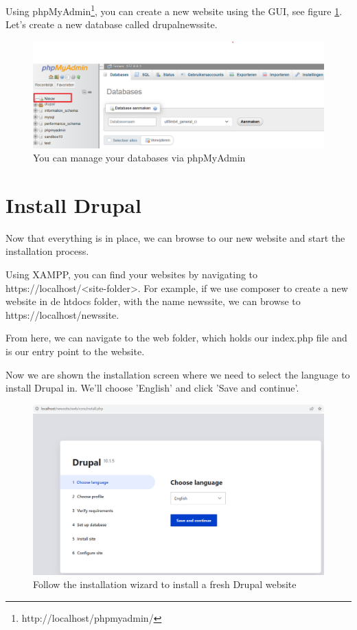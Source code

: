 Using phpMyAdmin\footnote{http://localhost/phpmyadmin/}, you can create a new website using the GUI, see figure  \ref{fig:db_create}. Let's create a new database called drupal\textunderscore newssite.


\begin{figure}[h]
    \centering
    \includegraphics[width=1\linewidth]{img/ch3/createDB}
    \caption{You can manage your databases via phpMyAdmin}
    \label{fig:db_create}
\end{figure}

\section{Install Drupal}
Now that everything is in place, we can browse to our new website and start the installation process.

Using XAMPP, you can find your websites by navigating to https://localhost/<site-folder>. For example, if we use composer to create a new website in de htdocs folder, with the name newssite, we can browse to https://localhost/newssite.

From here, we can navigate to the web folder, which holds our index.php file and is our entry point to the website.

Now we are shown the installation screen where we need to select the language to install Drupal in. We'll choose 'English' and click 'Save and continue'.

\begin{figure}[h]
    \centering
    \includegraphics[width=1\linewidth]{img/ch3/install_step1}
    \caption{Follow the installation wizard to install a fresh Drupal website}
    \label{fig:install_step1}
\end{figure}

